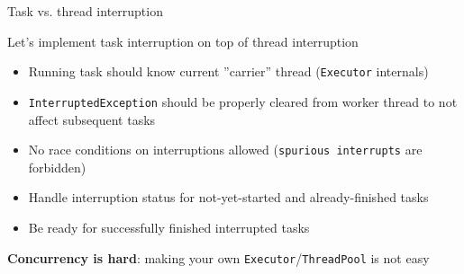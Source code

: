 \begin{frame}[t]{Task vs. thread interruption}

Let's implement task interruption on top of thread interruption

\pause

\begin{itemize}
    \item Running task should know current ''carrier'' thread (\texttt{Executor} internals)
    \item \texttt{InterruptedException} should be properly cleared from worker thread to not affect subsequent tasks
    \item No race conditions on interruptions allowed (\texttt{spurious interrupts} are forbidden)
    \item Handle interruption status for not-yet-started and already-finished tasks
    \item Be ready for successfully finished interrupted tasks 
\end{itemize}

\pause
\textbf{Concurrency is hard}: making your own \texttt{Executor}/\texttt{ThreadPool} is not easy
\end{frame}


